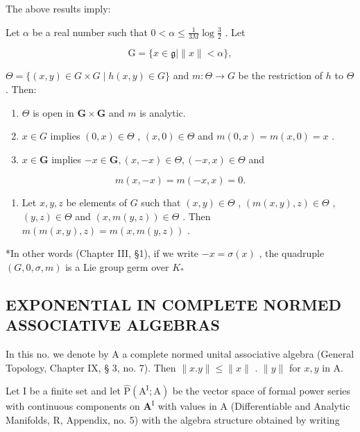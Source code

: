 The above results imply:

Let \(\alpha\) be a real number such that \(0 < \alpha \leqslant \frac{1}{3M} \log \frac{3}{2}\) . Let

\[
\mathrm{G} = \{x \in \mathfrak {g} \mid \| x \| <   \alpha \},
\]

\(\Theta = \{(x,y) \in G \times G \mid h(x,y) \in G\}\) and \(m: \Theta \to G\) be the restriction of \(h\) to \(\Theta\) . Then:

\begin{enumerate}
\def\labelenumi{(\arabic{enumi})}
\item
  \(\Theta\) is open in \(\mathbf{G} \times \mathbf{G}\) and \(m\) is analytic.
\item
  \(x \in G\) implies \((0, x) \in \Theta\) , \((x, 0) \in \Theta\) and \(m(0, x) = m(x, 0) = x\) .
\item
  \(x \in \mathbf{G}\) implies \(-x \in \mathbf{G}, (x, -x) \in \Theta, (-x, x) \in \Theta\) and
\end{enumerate}

\[
m (x, - x) = m (- x, x) = 0.
\]

\begin{enumerate}
\def\labelenumi{(\arabic{enumi})}
\setcounter{enumi}{3}
\tightlist
\item
  Let \(x, y, z\) be elements of \(G\) such that \((x, y) \in \Theta\) , \((m(x, y), z) \in \Theta\) , \((y, z) \in \Theta\) and \((x, m(y, z)) \in \Theta\) . Then \(m(m(x, y), z) = m(x, m(y, z))\) .
\end{enumerate}

*In other words (Chapter III, §1), if we write \(-x = \sigma(x)\) , the quadruple \((G, 0, \sigma, m)\) is a Lie group germ over \(K_*\)

\subsection{EXPONENTIAL IN COMPLETE NORMED ASSOCIATIVE ALGEBRAS}

In this no. we denote by A a complete normed unital associative algebra (General Topology, Chapter IX, § 3, no. 7). Then \(\| x.y\| \leqslant \| x\|\) . \(\| y\|\) for \(x,y\) in A.

Let I be a finite set and let \(\hat{\mathrm{P}} (\mathrm{A}^{\mathrm{I}};\mathrm{A})\) be the vector space of formal power series with continuous components on \(\mathbf{A}^{\mathrm{I}}\) with values in A (Differentiable and Analytic Manifolds, R, Appendix, no. 5) with the algebra structure obtained by writing

